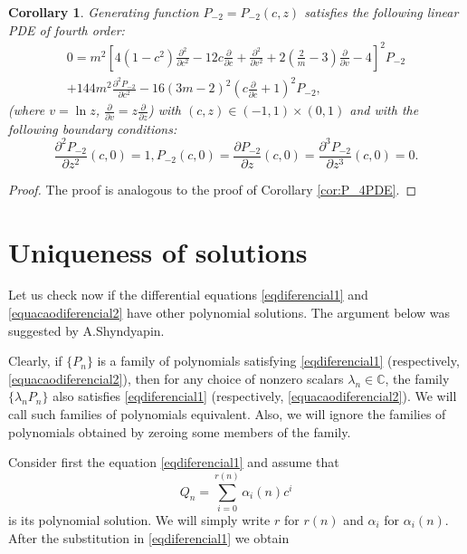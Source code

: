 \documentclass[review,nopreprintline]{elsarticle}
\newtheorem{corollary}[theorem]{Corollary}
\theoremstyle{definition}
\numberwithin{equation}{section}
\theoremstyle{remark}
\newcommand{\Cx}{\mathbb{C}}
\begin{document}
	        
	       \begin{corollary}\label{cor:P_2PDE}
	        Generating function $P_{-2}=P_{-2}(c,z)$ satisfies the following linear PDE of fourth order:
	            \begin{multline}
	0=m^2\left[4(1-c^2)\frac{\partial^2 }{\partial c^2}-12 c\frac{\partial }{\partial c}+\frac{\partial^2 }{\partial v^2} +2 (\frac{2}{m}-3)\frac{\partial }{\partial v}-4\right]^2 P_{-2}\\
	+144 m^2\frac{\partial^2 P_{-2}}{\partial c^2}-16(3m-2)^2(c\frac{\partial }{\partial c}+1)^2 P_{-2}, \label{eqn:P_2PDE}
	\end{multline}
	(where $v=\ln z$, $\frac{\partial}{\partial v}=z\frac{\partial }{\partial z}$) with $(c,z)\in (-1,1)\times (0,1)$ and with the following
	 boundary conditions:
	\begin{equation}\label{eqn:P_2PDE_BC}
	    \frac{\partial^2 P_{-2}}{\partial z^2}(c,0)=1, P_{-2}(c,0)=\frac{\partial P_{-2}}{\partial z}(c,0)=\frac{\partial^3 P_{-2}}{\partial z^3}(c,0)=0.
	\end{equation}        
	        \end{corollary}
	        \begin{proof}
	          The proof is analogous to the proof of Corollary \ref{cor:P_4PDE}.
	        \end{proof}
	        
	         \section{Uniqueness of  solutions}
	         Let us check now if the differential equations \eqref{eqdiferencial1} and \eqref{equacaodiferencial2} 
	         have other polynomial solutions. The argument below was suggested by A.Shyndyapin. 
	         
	         Clearly, if $\{P_n\}$ is a family of polynomials satisfying \eqref{eqdiferencial1} (respectively, \eqref{equacaodiferencial2}),
	         then for any choice of nonzero scalars $\lambda_n\in \Cx$, the family $\{\lambda_n P_n\}$ also satisfies \eqref{eqdiferencial1} (respectively, \eqref{equacaodiferencial2}). We will call such families of polynomials equivalent. Also, we will ignore the families of polynomials obtained by zeroing some members of the family. 
	          
	            Consider first the equation \eqref{eqdiferencial1} and assume that   
	            $$Q_n=\sum\limits_{i=0}^{r(n)} \alpha_i(n) c^i$$
	             is  its polynomial solution. We will simply write $r$ for $r(n)$ and $\alpha_i$ for $\alpha_i(n)$.
	             After the substitution in \eqref{eqdiferencial1} we obtain
	            
\end{document}

